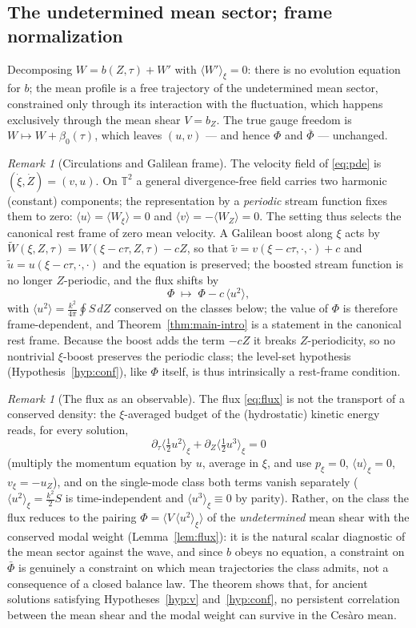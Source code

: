 \documentclass[11pt]{amsart}
\theoremstyle{definition}
\theoremstyle{remark}
\newtheorem{remark}[theorem]{Remark}
\newcommand{\T}{\mathbb{T}}
\newcommand{\Fbar}{\bar\Phi}
\newcommand{\mean}[1]{\langle #1\rangle}
\begin{document}
\subsection{The undetermined mean sector; frame normalization}
\label{subsec:frame}
Decomposing $W=b(Z,\tau)+W'$ with $\mean{W'}_\xi=0$: there is no
evolution equation for $b$; the mean profile is a free trajectory of the
undetermined mean sector, constrained only through its interaction with
the fluctuation, which happens exclusively through the mean shear
$V=b_Z$. The true gauge freedom is $W\mapsto W+\beta_0(\tau)$, which
leaves $(u,v)$ --- and hence $\Phi$ and $\Fbar$ --- unchanged.

\begin{remark}[Circulations and Galilean frame]\label{rem:frame}
The velocity field of \eqref{eq:pde} is $(\dot\xi,\dot Z)=(v,u)$. On
$\T^2$ a general divergence-free field carries two harmonic (constant)
components; the representation by a \emph{periodic} stream function
fixes them to zero: $\mean{u}=\mean{W_\xi}=0$ and
$\mean{v}=-\mean{W_Z}=0$. The setting thus selects the canonical rest
frame of zero mean velocity. A Galilean boost along $\xi$ acts by
$\widetilde W(\xi,Z,\tau)=W(\xi-c\tau,Z,\tau)-cZ$, so that
$\widetilde v=v(\xi-c\tau,\cdot,\cdot)+c$ and
$\widetilde u=u(\xi-c\tau,\cdot,\cdot)$ and the equation is preserved;
the boosted stream function is no longer $Z$-periodic, and the flux
shifts by
\[
  \Phi\;\longmapsto\;\Phi-c\,\mean{u^2},
\]
with $\mean{u^2}=\tfrac{k^2}{4\pi}\oint S\,dZ$ conserved on the classes
below; the value of $\Phi$ is therefore frame-dependent, and
Theorem~\ref{thm:main-intro} is a statement in the canonical rest frame.
Because the boost adds the term $-cZ$ it breaks $Z$-periodicity, so no
nontrivial $\xi$-boost preserves the periodic class; the level-set
hypothesis (Hypothesis~\ref{hyp:conf}), like $\Phi$ itself, is thus
intrinsically a rest-frame condition.
\end{remark}

\begin{remark}[The flux as an observable]\label{rem:observable}
The flux \eqref{eq:flux} is not the transport of a conserved density:
the $\xi$-averaged budget of the (hydrostatic) kinetic energy reads, for
every solution,
\[
  \partial_\tau\mean{\tfrac12u^2}_\xi
  +\partial_Z\mean{\tfrac12u^3}_\xi=0
\]
(multiply the momentum equation by $u$, average in $\xi$, and use
$p_\xi=0$, $\mean{u}_\xi=0$, $v_\xi=-u_Z$), and on the single-mode class
both terms vanish separately ($\mean{u^2}_\xi=\tfrac{k^2}2S$ is
time-independent and $\mean{u^3}_\xi\equiv0$ by parity). Rather, on the
class the flux reduces to the pairing $\Phi=\mean{V\,\mean{u^2}_\xi}$ of
the \emph{undetermined} mean shear with the conserved modal weight
(Lemma~\ref{lem:flux}): it is the natural scalar diagnostic of the mean
sector against the wave, and since $b$ obeys no equation, a constraint
on $\Fbar$ is genuinely a constraint on which mean trajectories the
class admits, not a consequence of a closed balance law. The theorem
shows that, for ancient solutions satisfying
Hypotheses~\ref{hyp:v} and~\ref{hyp:conf}, no persistent correlation
between the mean shear and the modal weight can survive in the Ces\`aro
mean.
\end{remark}
\end{document}
